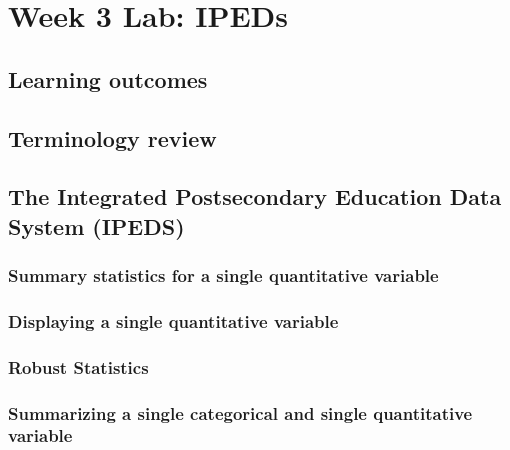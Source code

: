 \documentclass[
]{report}
\begin{document}
\hypertarget{week-3-lab-ipeds}{%
\section{Week 3 Lab: IPEDs}\label{week-3-lab-ipeds}}

\hypertarget{learning-outcomes-5}{%
\subsection{Learning outcomes}\label{learning-outcomes-5}}

\hypertarget{terminology-review-5}{%
\subsection{Terminology review}\label{terminology-review-5}}

\hypertarget{the-integrated-postsecondary-education-data-system-ipeds}{%
\subsection{The Integrated Postsecondary Education Data System (IPEDS)}\label{the-integrated-postsecondary-education-data-system-ipeds}}

\hypertarget{summary-statistics-for-a-single-quantitative-variable}{%
\subsubsection*{Summary statistics for a single quantitative variable}\label{summary-statistics-for-a-single-quantitative-variable}}

\hypertarget{displaying-a-single-quantitative-variable}{%
\subsubsection*{Displaying a single quantitative variable}\label{displaying-a-single-quantitative-variable}}

\hypertarget{robust-statistics-1}{%
\subsubsection*{Robust Statistics}\label{robust-statistics-1}}

\hypertarget{summarizing-a-single-categorical-and-single-quantitative-variable}{%
\subsubsection*{Summarizing a single categorical and single quantitative variable}\label{summarizing-a-single-categorical-and-single-quantitative-variable}}
\end{document}
